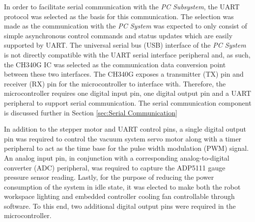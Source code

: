 
In order to facilitate serial communication with the \textit{PC Subsystem}, the UART protocol was selected as the basis for this communication. The selection was made as the communication with the \textit{PC System} was expected to only consist of simple asynchronous control commands and status updates which are easily supported by UART. The universal serial bus (USB) interface of the \textit{PC System} is not directly compatible with the UART serial interface peripheral and, as such, the CH340G IC was selected as the communication data conversion point between these two interfaces. The CH340G exposes a transmitter (TX) pin and receiver (RX) pin for the microcontroller to interface with. Therefore, the microcontroller requires one digital input pin, one digital output pin and a UART peripheral to support serial communication. The serial communication component is discussed further in Section \ref{sec:Serial Communication}

In addition to the stepper motor and UART control pins, a single digital output pin was required to control the vacuum system servo motor along with a timer peripheral to act as the time base for the pulse width modulation (PWM) signal. An analog input pin, in conjunction with a corresponding analog-to-digital converter (ADC) peripheral, was required to capture the ADP5111 gauge pressure sensor reading. Lastly, for the purpose of reducing the power consumption of the system in idle state, it was elected to make both the robot workspace lighting and embedded controller cooling fan controllable through software. To this end, two additional digital output pins were required in the microcontroller.


